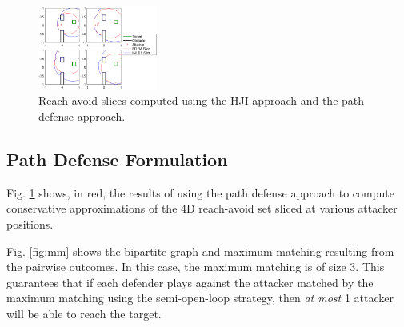 
\begin{figure}
	\centering
	\includegraphics[width=0.35\textwidth]{"fig/OLGame_compare"}
	\caption{Reach-avoid slices computed using the HJI approach and the path defense approach. }
	\label{fig:comp_ol}
\end{figure}

\subsection{Path Defense Formulation}

Fig. \ref{fig:comp_ol} shows, in red, the results of using the path defense approach to compute conservative approximations of the 4D reach-avoid set sliced at various attacker positions.


Fig. \ref{fig:mm} shows the bipartite graph and maximum matching resulting from the pairwise outcomes. In this case, the maximum matching is of size 3. This guarantees that if each defender plays against the attacker matched by the maximum matching using the semi-open-loop strategy, then \textit{at most} 1 attacker will be able to reach the target.

